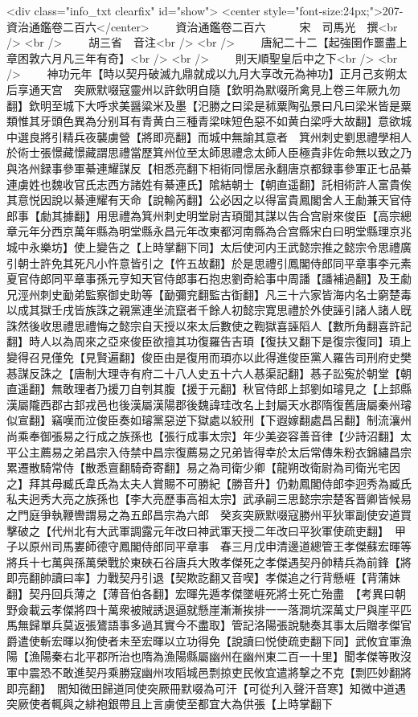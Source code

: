 <div class="info_txt clearfix" id="show">
<center style="font-size:24px;">207-資治通鑑卷二百六</center>
  　　資治通鑑卷二百六　　　宋　司馬光　撰<br />
<br />
　　胡三省　音注<br />
<br />
　　唐紀二十二【起強圉作噩盡上章困敦六月凡三年有奇】<br />
<br />
　　則天順聖皇后中之下<br />
<br />
　　神功元年【時以契丹破滅九鼎就成以九月大享改元為神功】正月己亥朔太后享通天宫　突厥默啜寇靈州以許欽明自隨【欽明為默啜所禽見上卷三年厥九勿翻】欽明至城下大呼求美醤粱米及墨【汜勝之曰梁是秫粟陶弘景曰凡曰梁米皆是粟類惟其牙頭色異為分别耳有青黄白三種青梁味短色惡不如黄白梁呼大故翻】意欲城中選良將引精兵夜襲虜營【將即亮翻】而城中無諭其意者　箕州刺史劉思禮學相人於術士張憬藏憬藏謂思禮當歷箕州位至太師思禮念太師人臣極貴非佐命無以致之乃與洛州録事參軍綦連耀謀反【相悉亮翻下相術同憬居永翻唐京都録事參軍正七品綦連虜姓也魏收官氏志西方諸姓有綦連氏】隂結朝士【朝直遥翻】託相術許人富貴俟其意悦因說以綦連耀有天命【說輸芮翻】公必因之以得富貴鳳閣舍人王勮兼天官侍郎事【勮其據翻】用思禮為箕州刺史明堂尉吉頊聞其謀以告合宫尉來俊臣【高宗總章元年分西京萬年縣為明堂縣永昌元年改東都河南縣為合宫縣宋白曰明堂縣理京兆城中永樂坊】使上變告之【上時掌翻下同】太后使河内王武懿宗推之懿宗令思禮廣引朝士許免其死凡小忤意皆引之【忤五故翻】於是思禮引鳳閣侍郎同平章事李元素夏官侍郎同平章事孫元亨知天官侍郎事石抱忠劉奇給事中周譒【譒補過翻】及王勮兄涇州刺史勔弟監察御史助等【勔彌兖翻監古衘翻】凡三十六家皆海内名士窮楚毒以成其獄壬戌皆族誅之親黨連坐流竄者千餘人初懿宗寛思禮於外使誣引諸人諸人旣誅然後收思禮思禮悔之懿宗自天授以來太后數使之鞫獄喜誣䧟人【數所角翻喜許記翻】時人以為周來之亞來俊臣欲擅其功復羅告吉頊【復扶又翻下是復宗復同】頊上變得召見僅免【見賢遍翻】俊臣由是復用而頊亦以此得進俊臣黨人羅告司刑府史樊惎謀反誅之【唐制大理寺有府二十八人史五十六人惎渠記翻】惎子訟寃於朝堂【朝直遥翻】無敢理者乃援刀自刳其腹【援于元翻】秋官侍郎上邽劉如璿見之【上邽縣漢屬隴西郡古邽戎邑也後漢屬漢陽郡後魏諱珪改名上封屬天水郡隋復舊唐屬秦州璿似宣翻】竊嘆而泣俊臣奏如璿黨惡逆下獄處以絞刑【下遐嫁翻處昌呂翻】制流瀼州　尚乘奉御張易之行成之族孫也【張行成事太宗】年少美姿容善音律【少詩沼翻】太平公主薦易之弟昌宗入侍禁中昌宗復薦易之兄弟皆得幸於太后常傳朱粉衣錦繡昌宗累遷散騎常侍【散悉亶翻騎奇寄翻】易之為司衛少卿【龍朔改衛尉為司衛光宅因之】拜其母臧氏韋氏為太夫人賞賜不可勝紀【勝音升】仍勅鳳閣侍郎李迥秀為臧氏私夫迥秀大亮之族孫也【李大亮歷事高祖太宗】武承嗣三思懿宗宗楚客晋卿皆候易之門庭爭執鞭轡謂易之為五郎昌宗為六郎　癸亥突厥默啜寇勝州平狄軍副使安道買擊破之【代州北有大武軍調露元年改曰神武軍天授二年改曰平狄軍使疏吏翻】　甲子以原州司馬婁師德守鳳閣侍郎同平章事　春三月戊申清邊道總管王孝傑蘇宏暉等將兵十七萬與孫萬榮戰於東硤石谷唐兵大敗孝傑死之孝傑遇契丹帥精兵為前鋒【將即亮翻帥讀曰率】力戰契丹引退【契欺訖翻又音喫】孝傑追之行背懸崕【背蒲妹翻】契丹回兵薄之【薄音伯各翻】宏暉先遁孝傑墜崕死將士死亡殆盡　【考異曰朝野僉載云孝傑將四十萬衆被賊誘退逼就懸崖漸漸挨排一一落澗坑深萬丈尸與崖平匹馬無歸單兵莫返張鷟語事多過其實今不盡取】管記洛陽張說馳奏其事太后贈孝傑官爵遣使斬宏暉以狥使者未至宏暉以立功得免【說讀曰悦使疏吏翻下同】武攸宜軍漁陽【漁陽秦右北平郡所治也隋為漁陽縣屬幽州在幽州東二百一十里】聞孝傑等敗沒軍中震恐不敢進契丹乘勝寇幽州攻䧟城邑剽掠吏民攸宜遣將撃之不克【剽匹妙翻將即亮翻】　閻知微田歸道同使突厥冊默啜為可汗【可從刋入聲汗音寒】知微中道遇突厥使者輒與之緋袍銀帶且上言虜使至都宜大為供張【上時掌翻下